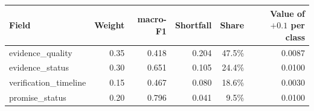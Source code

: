 \begin{tabular}{lrrrrr}
\toprule
Field & Weight & macro-F1 & Shortfall & Share & Value of $+0.1$ per class \\
\midrule
evidence\_quality & 0.35 & 0.418 & 0.204 & 47.5\% & 0.0087 \\
evidence\_status & 0.30 & 0.651 & 0.105 & 24.4\% & 0.0100 \\
verification\_timeline & 0.15 & 0.467 & 0.080 & 18.6\% & 0.0030 \\
promise\_status & 0.20 & 0.796 & 0.041 & 9.5\% & 0.0100 \\
\bottomrule
\end{tabular}
